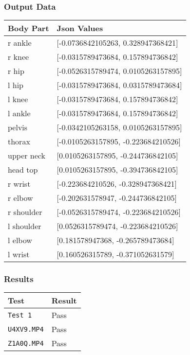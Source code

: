 \documentclass{scrreprt}
\begin{document}
\subsubsection{Output Data}
\begin{table}[H]
    \centering
    \begin{tabular}{||p{2cm}|p{6.5cm}||}
        \hline
        \textbf{Body Part} & \textbf {Json Values}\\
         \hline\hline
        r ankle & [-0.0736842105263, 0.328947368421] \\
        \hline
        r knee & [-0.0315789473684, 0.157894736842] \\
        \hline
        r hip & [-0.0526315789474, 0.0105263157895] \\
        \hline
        l hip & [-0.0315789473684, 0.0315789473684] \\
        \hline
        l knee & [-0.0315789473684, 0.157894736842] \\
        \hline
        l ankle & [-0.0315789473684, 0.157894736842] \\
        \hline
        pelvis & [-0.0342105263158, 0.0105263157895]\\
        \hline
        thorax & [-0.0105263157895, -0.223684210526] \\
        \hline
        upper neck & [0.0105263157895, -0.244736842105] \\
        \hline
        head top & [0.0105263157895, -0.394736842105] \\
        \hline
        r wrist & [-0.223684210526, -0.328947368421] \\
        \hline
        r elbow & [-0.202631578947, -0.244736842105] \\
        \hline
        r shoulder & [-0.0526315789474, -0.223684210526] \\
        \hline
        l shoulder & [0.0526315789474, -0.223684210526] \\
        \hline
        l elbow & [0.181578947368, -0.265789473684] \\
        \hline
        l wrist & [0.160526315789, -0.371052631579] \\
        \hline
    \end{tabular}
\end{table}

\subsubsection{Results}
\begin{table}[H]
        \centering
        \begin{tabular}{||p{2.5cm}|p{2.5cm}||}
                \hline
                \textbf Test & \textbf Result\\
                \hline\hline
                \verb|Test 1|  &  Pass\\
                \hline
                \verb|U4XV9.MP4|  &  Pass\\
                \hline
                \verb|Z1A0Q.MP4| & Pass\\
                \hline
        \end{tabular}
\end{table}
\end{document}
